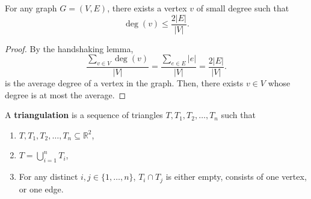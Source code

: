 
\begin{lemma}
	For any graph \( G = (V,E) \), there exists a vertex \( v \) of small degree such that \[
		\deg(v) \le \frac{2|E|}{|V|}
	.\] 
\end{lemma}
\begin{proof}
	By the handshaking lemma, \[
		\frac{\sum_{v \in V} \deg(v)}{|V|} = \frac{\sum_{e \in E}|e|}{|V|} = \frac{2|E|}{|V|}
	.\] is the average degree of a vertex in the graph. Then, there exists \( v \in V \) whose degree is at most the average.
\end{proof} 

\begin{definition}
	A \textbf{triangulation} is a sequence of triangles \( T, T_{1}, T_{2}, \ldots , T_n \) such that 
	\begin{enumerate}
		\item \( T, T_{1}, T_{2}, \ldots , T_n \subseteq  \mathbb{R}^{2}  \),
		\item \( T = \bigcup_{i=1}^{n}T_i   \),
		\item For any distinct \( i,j \in \{1, \ldots , n\}   \), \( T_i \cap T_j \) is either empty, consists of one vertex, or one edge.
	\end{enumerate}
\end{definition}

